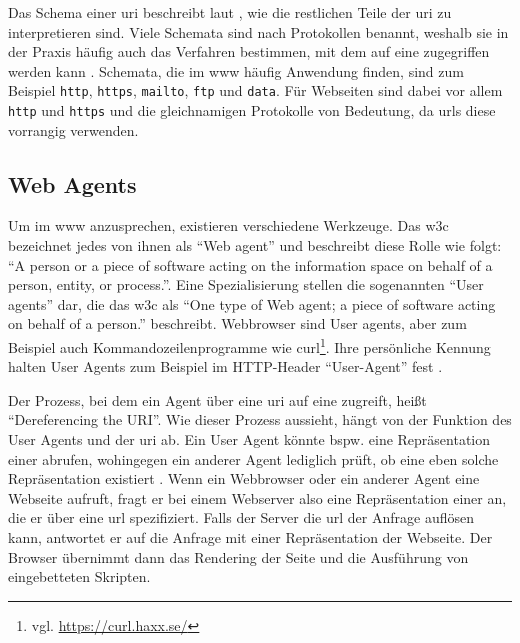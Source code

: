         Das Schema einer \gls{uri} beschreibt laut \cite[Kapitel 3.1]{rfc:3986},
        wie die restlichen Teile der \gls{uri} zu interpretieren sind.
        Viele Schemata sind nach Protokollen benannt,
        weshalb sie in der Praxis häufig auch das Verfahren bestimmen,
        mit dem auf eine {\resource} zugegriffen werden kann
        \cite[Kapitel 3.1]{w3c:wwwArch}.
        Schemata, die im \gls{www} häufig Anwendung finden,
        sind zum Beispiel
        \texttt{http},
        \texttt{https},
        \texttt{mailto},
        \texttt{ftp} und
        \texttt{data}.
        Für Webseiten sind dabei vor allem \texttt{http} und \texttt{https}
        und die gleichnamigen Protokolle von Bedeutung,
        da \glspl{url} diese vorrangig verwenden.

    \subsection{Web Agents}
        Um {\resources} im \gls{www} anzusprechen, existieren verschiedene Werkzeuge.
        Das \gls{w3c} \cite[Kapitel 6]{w3c:wwwArch} bezeichnet jedes von ihnen als
        "`Web agent"' und beschreibt diese Rolle wie folgt:
        "`A person or a piece of software acting on the information
        space on behalf of a person, entity, or process."'.
        Eine Spezialisierung stellen die sogenannten "`User agents"' dar,
        die das \gls{w3c} \cite[Kapitel 6]{w3c:wwwArch} als "`One type of Web agent;
        a piece of software acting on behalf of a person."' beschreibt.
        Webbrowser sind User agents, aber zum Beispiel auch Kommandozeilenprogramme
        wie curl\footnote{vgl. \url{https://curl.haxx.se/}}.
        Ihre persönliche Kennung halten User Agents zum Beispiel im
        HTTP-Header "`User-Agent"' fest \cite[Kapitel 5.5.3, Seite 46]{rfc:7231}.

        Der Prozess, bei dem ein Agent über eine \gls{uri} auf eine {\resource}
        zugreift, heißt "`Dereferencing the URI"'.
        Wie dieser Prozess aussieht, hängt von der Funktion des User Agents und der \gls{uri} ab.
        Ein User Agent könnte bspw. eine
        Repräsentation einer {\resource} abrufen, wohingegen ein anderer Agent
        lediglich prüft, ob eine eben solche Repräsentation existiert
        \cite[Kapitel 3.1]{w3c:wwwArch}.
        Wenn ein Webbrowser oder ein anderer Agent eine Webseite aufruft,
        fragt er bei einem Webserver also eine Repräsentation
        einer {\resource} an, die er über eine \gls{url} spezifiziert.
        Falls der Server die \gls{url} der Anfrage auflösen kann,
        antwortet er auf die Anfrage mit einer Repräsentation der Webseite.
        Der Browser übernimmt dann das Rendering der Seite und die Ausführung
        von eingebetteten Skripten.

